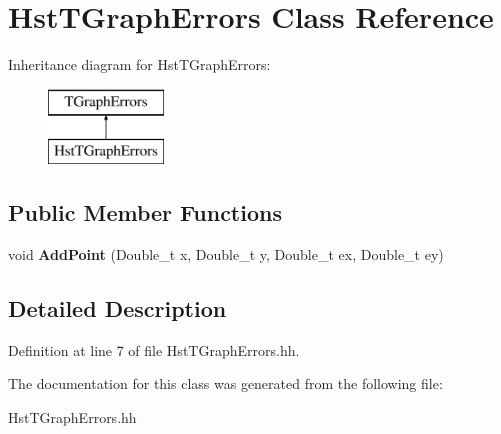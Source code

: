 \section{Hst\-T\-Graph\-Errors Class Reference}
\label{classHstTGraphErrors}
Inheritance diagram for Hst\-T\-Graph\-Errors\-:\begin{figure}[H]
\begin{center}
\leavevmode
\includegraphics[height=2.000000cm]{classHstTGraphErrors}
\end{center}
\end{figure}
\subsection*{Public Member Functions}
\begin{DoxyCompactItemize}
\item 
void {\bfseries Add\-Point} (Double\-\_\-t x, Double\-\_\-t y, Double\-\_\-t ex, Double\-\_\-t ey)\label{classHstTGraphErrors_ae5c0b07b9beab247ae528aa467c98530}

\end{DoxyCompactItemize}


\subsection{Detailed Description}


Definition at line 7 of file Hst\-T\-Graph\-Errors.\-hh.



The documentation for this class was generated from the following file\-:\begin{DoxyCompactItemize}
\item 
Hst\-T\-Graph\-Errors.\-hh\end{DoxyCompactItemize}
